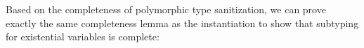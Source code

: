 Based on the completeness of polymorphic type sanitization, we can prove exactly
the same completeness lemma as the instantiation to show that subtyping for
existential variables is complete:

\begin{corollary}[\PolymorphicTypeSanitizationCompletenessSubtypingName]
  \label{lemma:\PolymorphicTypeSanitizationCompletenessSubtypingName}
  \PolymorphicTypeSanitizationCompletenessSubtypingBody
\end{corollary}


